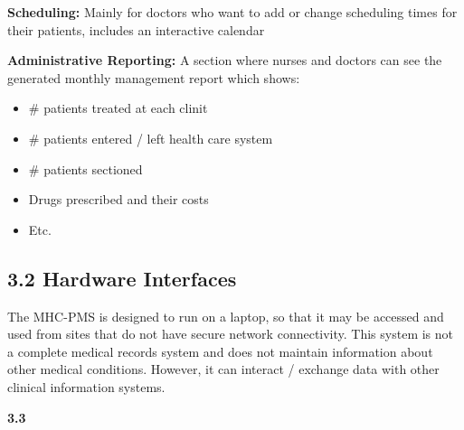 \documentclass[12pt]{article}
\renewcommand{\_}{\kern-1.5pt\textunderscore\kern-1.5pt}
\begin{document}
\vspace{\baselineskip}
\textbf{Scheduling: }Mainly for doctors who want to add or change scheduling times for their patients, includes an interactive calendar\par


\vspace{\baselineskip}
\textbf{Administrative Reporting: }A section where nurses and doctors can see the generated monthly management report which shows:\par

\begin{itemize}
	\item $\#$  patients treated at each clinit\par

	\item $\#$  patients entered / left health care system\par

	\item $\#$  patients sectioned\par

	\item Drugs prescribed and their costs\par

	\item Etc. 
\end{itemize}\par

\subsection*{3.2 \hspace*{10pt}Hardware Interfaces}
\tab The MHC-PMS is designed to run on a laptop, so that it may be accessed and used from sites that do not have secure network connectivity. This system is not a complete medical records system and does not maintain information about other medical conditions. However, it can interact / exchange data with other clinical information systems.\par


\vspace{\baselineskip}
{\fontsize{17pt}{20.4pt}\selectfont \textbf{3.3}{\fontsize{7pt}{8.4pt}\selectfont  {}\par}\par}\par
\end{document}
